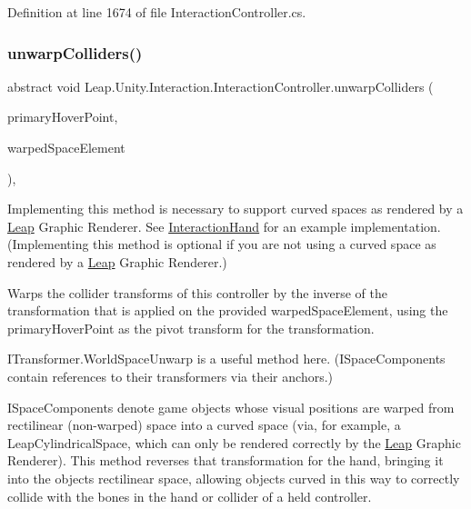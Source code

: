 Definition at line 1674 of file Interaction\+Controller.\+cs.

\mbox{\label{class_leap_1_1_unity_1_1_interaction_1_1_interaction_controller_aef6aebf580bed0a675b59e1c4a267376}} 
\subsubsection{\texorpdfstring{unwarpColliders()}{unwarpColliders()}}
{\footnotesize\ttfamily abstract void Leap.\+Unity.\+Interaction.\+Interaction\+Controller.\+unwarp\+Colliders (\begin{DoxyParamCaption}\item[{Transform}]{primary\+Hover\+Point,  }\item[{\mbox{\hyperlink{interface_leap_1_1_unity_1_1_space_1_1_i_space_component}{I\+Space\+Component}}}]{warped\+Space\+Element }\end{DoxyParamCaption})\hspace{0.3cm}{\ttfamily [protected]}, {}}



Implementing this method is necessary to support curved spaces as rendered by a \mbox{\hyperlink{namespace_leap_1_1_unity_1_1_leap}{Leap}} Graphic Renderer. See \mbox{\hyperlink{class_leap_1_1_unity_1_1_interaction_1_1_interaction_hand}{Interaction\+Hand}} for an example implementation. (Implementing this method is optional if you are not using a curved space as rendered by a \mbox{\hyperlink{namespace_leap_1_1_unity_1_1_leap}{Leap}} Graphic Renderer.) 

Warps the collider transforms of this controller by the inverse of the transformation that is applied on the provided warped\+Space\+Element, using the primary\+Hover\+Point as the pivot transform for the transformation.

I\+Transformer.\+World\+Space\+Unwarp is a useful method here. (I\+Space\+Components contain references to their transformers via their anchors.)

I\+Space\+Components denote game objects whose visual positions are warped from rectilinear (non-\/warped) space into a curved space (via, for example, a Leap\+Cylindrical\+Space, which can only be rendered correctly by the \mbox{\hyperlink{namespace_leap_1_1_unity_1_1_leap}{Leap}} Graphic Renderer). This method reverses that transformation for the hand, bringing it into the object\textquotesingle{}s rectilinear space, allowing objects curved in this way to correctly collide with the bones in the hand or collider of a held controller.

